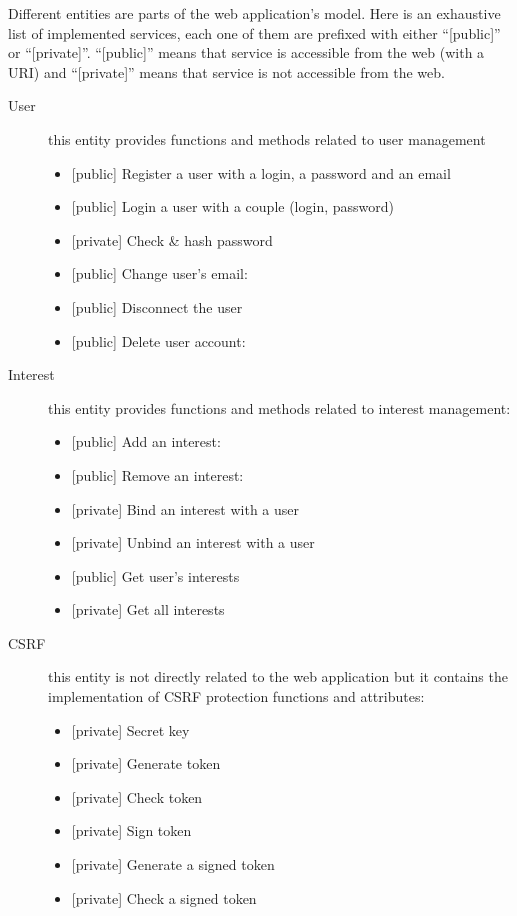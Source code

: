 \documentclass[a4paper,11pt,openany]{report}
\begin{document}
Different entities are parts of the web application's model. Here is an exhaustive list of implemented 
services, each one of them are prefixed with either ``[public]'' or ``[private]''. ``[public]'' means that 
service is accessible from the web (with a URI) and ``[private]'' means that service is not accessible from 
the web.
\begin{description}
 \item[User] this entity provides functions and methods related to user management
 \begin{itemize}[label=--]
  \item {[}public{]} Register a user with a login, a password and an email
  \item {[}public{]} Login a user with a couple (login, password)
  \item {[}private{]} Check \& hash password
  \item {[}public{]} Change user's email: \color{red}{vulnerable to CSRF attack}\color{black}{}
  \item {[}public{]} Disconnect the user
  \item {[}public{]} Delete user account: \color{green}{protected against CSRF attack}\color{black}{}
 \end{itemize}
 
 \item[Interest] this entity provides functions and methods related to interest management:
 \begin{itemize}[label=--]
  \item {[}public{]} Add an interest: \color{green}{protected against CSRF attack}\color{black}{}
  \item {[}public{]} Remove an interest: \color{red}{vulnerable to CSRF attack}\color{black}{}
  \item {[}private{]} Bind an interest with a user
  \item {[}private{]} Unbind an interest with a user
  \item {[}public{]} Get user's interests
  \item {[}private{]} Get all interests
 \end{itemize}

 \item[CSRF] this entity is not directly related to the web application but it contains the 
 implementation of CSRF protection functions and attributes:
 \begin{itemize}[label=--]
  \item {[}private{]} Secret key
  \item {[}private{]} Generate token
  \item {[}private{]} Check token
  \item {[}private{]} Sign token
  \item {[}private{]} Generate a signed token
  \item {[}private{]} Check a signed token
 \end{itemize}

\end{description}
\end{document}
